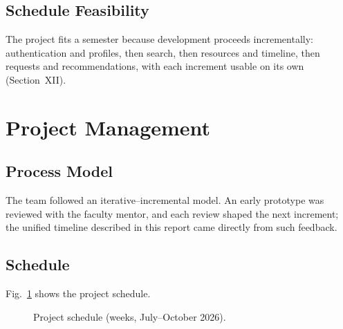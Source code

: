 \documentclass[conference]{IEEEtran}
\begin{document}
\subsection{Schedule Feasibility}
The project fits a semester because development proceeds incrementally: authentication and profiles, then search, then resources and timeline, then requests and recommendations, with each increment usable on its own (Section~XII).

\section{Project Management}

\subsection{Process Model}
The team followed an iterative--incremental model. An early prototype was reviewed with the faculty mentor, and each review shaped the next increment; the unified timeline described in this report came directly from such feedback.

\subsection{Schedule}
Fig.~\ref{fig:gantt} shows the project schedule.

\begin{figure}[t]
\centering
{}
\caption{Project schedule (weeks, July--October 2026).}
\label{fig:gantt}
\end{figure}
\end{document}
